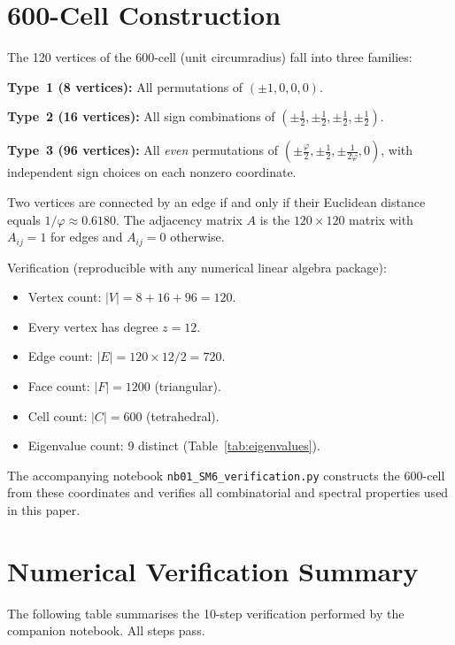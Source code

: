 \documentclass[11pt,letterpaper]{article}
\newcommand{\phig}{\varphi}
\begin{document}
\section{600-Cell Construction}
\label{app:construction}

The 120 vertices of the 600-cell (unit circumradius) fall into three families:

\noindent\textbf{Type~1 (8 vertices):} All permutations of $(\pm1, 0, 0, 0)$.

\noindent\textbf{Type~2 (16 vertices):} All sign combinations of $(\pm\tfrac{1}{2}, \pm\tfrac{1}{2}, \pm\tfrac{1}{2}, \pm\tfrac{1}{2})$.

\noindent\textbf{Type~3 (96 vertices):} All \emph{even} permutations of $(\pm\tfrac{\phig}{2}, \pm\tfrac{1}{2}, \pm\tfrac{1}{2\phig}, 0)$, with independent sign choices on each nonzero coordinate.

Two vertices are connected by an edge if and only if their Euclidean distance equals $1/\phig \approx 0.6180$. The adjacency matrix $A$ is the $120 \times 120$ matrix with $A_{ij} = 1$ for edges and $A_{ij} = 0$ otherwise.

Verification (reproducible with any numerical linear algebra package):
\begin{itemize}
\item Vertex count: $|V| = 8 + 16 + 96 = 120$.
\item Every vertex has degree $z = 12$.
\item Edge count: $|E| = 120 \times 12 / 2 = 720$.
\item Face count: $|F| = 1200$ (triangular).
\item Cell count: $|C| = 600$ (tetrahedral).
\item Eigenvalue count: 9 distinct (Table~\ref{tab:eigenvalues}).
\end{itemize}

The accompanying notebook \texttt{nb01\_SM6\_verification.py} constructs the 600-cell from these coordinates and verifies all combinatorial and spectral properties used in this paper.

\section{Numerical Verification Summary}
\label{app:verification}

The following table summarises the 10-step verification performed by the companion notebook. All steps pass.
\end{document}
